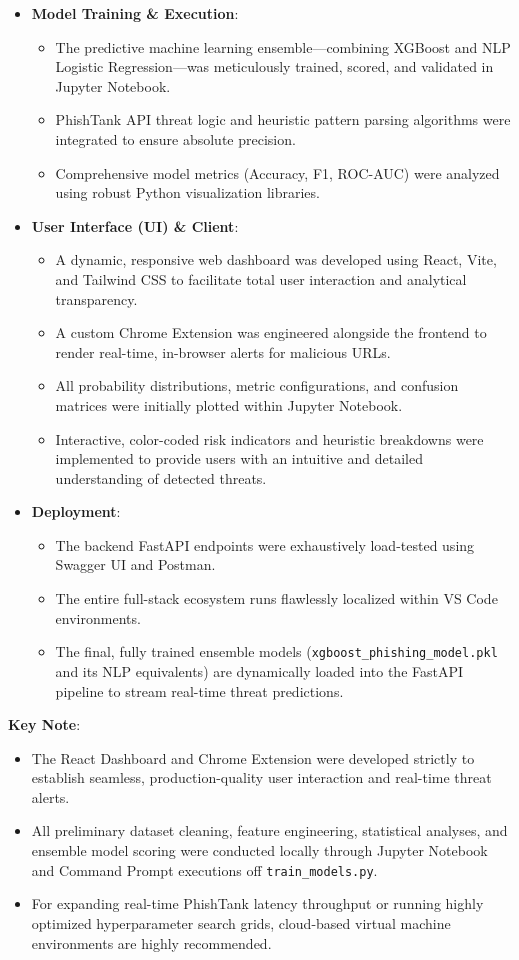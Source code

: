 \begin{itemize}
\item \textbf{Model Training \& Execution}:
\begin{itemize}
\item The predictive machine learning ensemble---combining XGBoost and NLP Logistic Regression---was meticulously trained, scored, and validated in Jupyter Notebook.
\item PhishTank API threat logic and heuristic pattern parsing algorithms were integrated to ensure absolute precision.
\item Comprehensive model metrics (Accuracy, F1, ROC-AUC) were analyzed using robust Python visualization libraries.
\end{itemize}
\item \textbf{User Interface (UI) \& Client}:
\begin{itemize}
\item A dynamic, responsive web dashboard was developed using React, Vite, and Tailwind CSS to facilitate total user interaction and analytical transparency.
\item A custom Chrome Extension was engineered alongside the frontend to render real-time, in-browser alerts for malicious URLs.
\item All probability distributions, metric configurations, and confusion matrices were initially plotted within Jupyter Notebook.
\item Interactive, color-coded risk indicators and heuristic breakdowns were implemented to provide users with an intuitive and detailed understanding of detected threats.
\end{itemize}
\item \textbf{Deployment}:
\begin{itemize}
\item The backend FastAPI endpoints were exhaustively load-tested using Swagger UI and Postman.
\item The entire full-stack ecosystem runs flawlessly localized within VS Code environments.
\item The final, fully trained ensemble models (\texttt{xgboost\_phishing\_model.pkl} and its NLP equivalents) are dynamically loaded into the FastAPI pipeline to stream real-time threat predictions.
\end{itemize}
\end{itemize}
\noindent
\textbf{Key Note}:

\begin{itemize}
\item The React Dashboard and Chrome Extension were developed strictly to establish seamless, production-quality user interaction and real-time threat alerts.
\item All preliminary dataset cleaning, feature engineering, statistical analyses, and ensemble model scoring were conducted locally through Jupyter Notebook and Command Prompt executions off \texttt{train\_models.py}.
\item For expanding real-time PhishTank latency throughput or running highly optimized hyperparameter search grids, cloud-based virtual machine environments are highly recommended.
\end{itemize}

